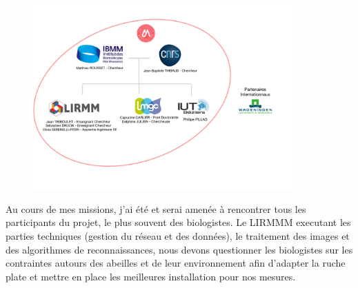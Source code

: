 \documentclass[11pt,french,a4paper]{report}
\begin{document}
{\begin{figure}[!h]
    \centering 
    \includegraphics[width=10cm]{./img/orga.jpg}
    \label{orga_sbl}
\end{figure}

Au cours de mes missions, j'ai été et serai amenée à rencontrer tous les participants du projet, le plus souvent des biologistes.
Le LIRMMM executant les parties techniques (gestion du réseau et des données), le traitement des images et des algorithmes de reconnaissances, 
nous devons questionner les biologistes  sur les contraintes autours des abeilles et de leur environnement afin d'adapter la ruche plate et mettre 
en place les meilleures installation pour nos mesures. 


}
\end{document}

